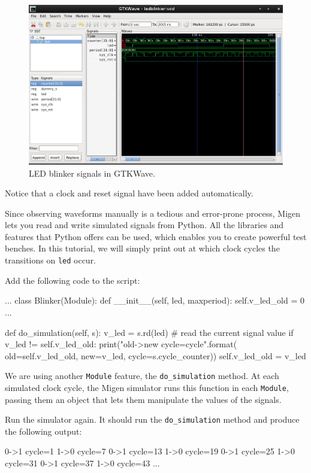 \documentclass[11pt]{paper}
\begin{document}
\begin{figure}[h]
\centering
\includegraphics[width=\textwidth]{gtkwave.png}
\caption{LED blinker signals in GTKWave.}
\end{figure}

Notice that a clock and reset signal have been added automatically.

Since observing waveforms manually is a tedious and error-prone process, Migen lets you read and write simulated signals from Python. All the libraries and features that Python offers can be used, which enables you to create powerful test benches. In this tutorial, we will simply print out at which clock cycles the transitions on \verb!led! occur.

Add the following code to the script:
\begin{samepage}
\begin{verbatimtab}
...
class Blinker(Module):
	def __init__(self, led, maxperiod):
		self.v_led_old = 0
		...

	def do_simulation(self, s):
		v_led = s.rd(led) # read the current signal value
		if v_led != self.v_led_old:
			print("{old}->{new} cycle={cycle}".format(
				old=self.v_led_old, new=v_led,
				cycle=s.cycle_counter))
			self.v_led_old = v_led
\end{verbatimtab}
\end{samepage}

We are using another \verb!Module! feature, the \verb!do_simulation! method. At each simulated clock cycle, the Migen simulator runs this function in each \verb!Module!, passing them an object that lets them manipulate the values of the signals.

Run the simulator again. It should run the \verb!do_simulation! method and produce the following output:
\begin{verbatimtab}
0->1 cycle=1
1->0 cycle=7
0->1 cycle=13
1->0 cycle=19
0->1 cycle=25
1->0 cycle=31
0->1 cycle=37
1->0 cycle=43
...
\end{verbatimtab}
\end{document}
